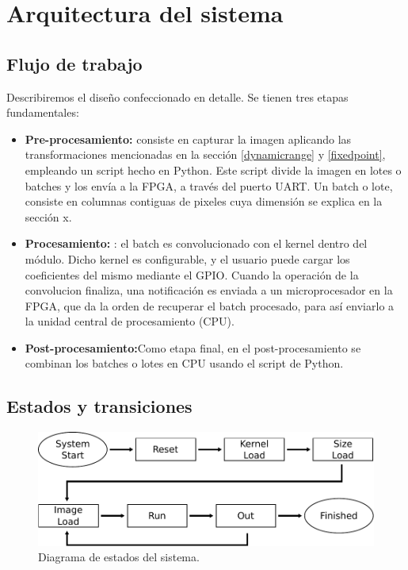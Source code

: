 \chapter{Arquitectura del sistema}  \label{arquitectura_sec}
\section{Flujo de trabajo}  \label{workflow_subsecc}

Describiremos el diseño confeccionado en detalle. Se tienen tres etapas fundamentales:

\begin{itemize}
\item \textbf{Pre-procesamiento:} consiste en capturar la imagen aplicando las
  transformaciones mencionadas en la sección \ref{dynamicrange} y
  \ref{fixedpoint}, empleando un script hecho en Python. Este script divide la
  imagen en lotes o batches y los envía a la FPGA, a través del puerto UART. Un
  batch o lote, consiste en columnas contiguas de pixeles cuya dimensión se
  explica en la sección x. %
\item \textbf{Procesamiento:}	: el batch es convolucionado con el kernel dentro del módulo. Dicho kernel es configurable, y el usuario puede cargar los coeficientes del mismo mediante el GPIO. 
  Cuando la operación de la convolucion finaliza, una notificación es enviada a
  un microprocesador en la FPGA, que da la orden de recuperar el batch procesado, para así enviarlo a la unidad central de procesamiento (CPU).
\item \textbf{Post-procesamiento:}Como etapa final, en el post-procesamiento se combinan los batches o lotes en CPU usando el script de Python.
\end{itemize}

\section{Estados y transiciones}  \label{states_subsecc}

\begin{figure}
\centering
\includegraphics[scale=0.7]{states.pdf}
\caption{Diagrama de estados del sistema.}
\label{statesfig}
\end{figure}

